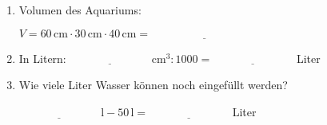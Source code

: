 \begin{enumerate}[label=\arabic*.]
    \begin{enumerate}[label=\alph*)]
        \item Volumen des Aquariums:

        $V = 60\,\text{cm} \cdot 30\,\text{cm} \cdot 40\,\text{cm} = \underline{\hspace{4cm}}$

        \vspace{0.5cm}

        \item In Litern: $\underline{\hspace{3cm}}\,\text{cm}^3 : 1000 = \underline{\hspace{3cm}}$ Liter

        \vspace{0.5cm}

        \item Wie viele Liter Wasser können noch eingefüllt werden?

        $\underline{\hspace{3cm}}\,\text{l} - 50\,\text{l} = \underline{\hspace{3cm}}$ Liter
    \end{enumerate}
\end{enumerate}